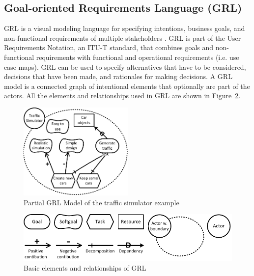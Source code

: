 \subsection{Goal-oriented Requirements Language (GRL)}
\label{sect:background:grl}
GRL is a visual modeling language for specifying intentions, business goals, and non-functional requirements of multiple stakeholders \cite{Amyot:2010:EGM:1841349.1841356}. GRL is part of the User Requirements Notation, an ITU-T standard, that combines goals and non-functional requirements with functional and operational requirements (i.e. use case maps). GRL can be used to specify alternatives that have to be considered, decisions that have been made, and rationales for making decisions. A GRL model is a connected graph of intentional elements that optionally are part of the actors. All the elements and relationships used in GRL are shown in Figure~\ref{fig:grl_legend}.

\begin{figure}[ht]
\centering
\includegraphics[width=0.5\textwidth]{img/Example1}
\caption{Partial GRL Model of the traffic simulator example}
\label{fig:example-small}
\end{figure} %

\begin{figure}[ht]
\centering
\includegraphics[scale=0.6]{img/grl_legend}
\caption{Basic elements and relationships of GRL}
\label{fig:grl_legend}
\end{figure}

